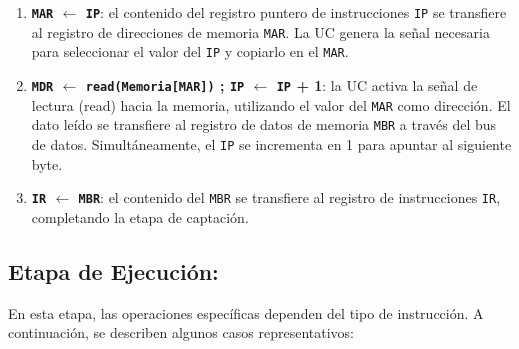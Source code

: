 \documentclass[12pt,oneside]{templates/unerthesis}
\providecommand{\tightlist}{%
  \setlength{\itemsep}{0pt}\setlength{\parskip}{0pt}}
\begin{document}
\begin{enumerate}
\def\labelenumi{\arabic{enumi}.}
\tightlist
\item
  \textbf{\texttt{MAR} \(\leftarrow\) \texttt{IP}}:
  el contenido del registro puntero de instrucciones \texttt{IP} se transfiere al registro de direcciones de memoria \texttt{MAR}. La UC genera la señal necesaria para seleccionar el valor del \texttt{IP} y copiarlo en el \texttt{MAR}.
\item
  \textbf{\texttt{MDR} \(\leftarrow\) \texttt{read(Memoria{[}MAR{]})} ; \texttt{IP} \(\leftarrow\) \texttt{IP} + 1}:
  la UC activa la señal de lectura (read) hacia la memoria, utilizando el valor del \texttt{MAR} como dirección. El dato leído se transfiere al registro de datos de memoria \texttt{MBR} a través del bus de datos. Simultáneamente, el \texttt{IP} se incrementa en 1 para apuntar al siguiente byte.
\item
  \textbf{\texttt{IR} \(\leftarrow\) \texttt{MBR}}:
  el contenido del \texttt{MBR} se transfiere al registro de instrucciones \texttt{IR}, completando la etapa de captación.
\end{enumerate}

\hypertarget{etapa-de-ejecuciuxf3n}{%
\subsection{Etapa de Ejecución:}\label{etapa-de-ejecuciuxf3n}}

En esta etapa, las operaciones específicas dependen del tipo de instrucción. A continuación, se describen algunos casos representativos:
\end{document}
